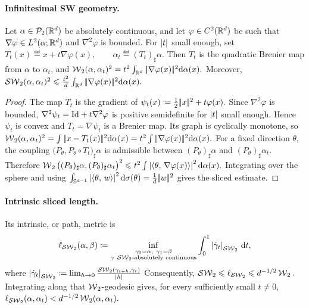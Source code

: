 \paragraph{Infinitesimal SW geometry.}
\begin{prop}\label{prop-sliced-first-order-tangent}
Let $\alpha\in\mathcal{P}_2(\mathbb{R}^d)$ be absolutely continuous, and let $\varphi\in C^2(\mathbb{R}^d)$ be such that $\nabla\varphi\in L^2(\alpha;\mathbb{R}^d)$ and $\nabla^2\varphi$ is bounded. For $\left\lvert t\right\rvert$ small enough, set
\(T_t(x)\eqdef x+t\nabla\varphi(x), \qquad \alpha_t\eqdef(T_t)_\sharp\alpha.\)
Then $T_t$ is the quadratic Brenier map from $\alpha$ to $\alpha_t$, and
\(\operatorname{\mathcal{W}}_2(\alpha,\alpha_t)^2 = t^2\int_{\mathbb{R}^d}|\!| \nabla\varphi(x) |\!|^2\mathrm{d}\alpha(x).\)
Moreover, \(\operatorname{\mathcal{SW}}_2(\alpha,\alpha_t)^2 \leqslant \frac{t^2}{d}\int_{\mathbb{R}^d}|\!| \nabla\varphi(x) |\!|^2\mathrm{d}\alpha(x).\)
\end{prop}
\begin{proof}
The map $T_t$ is the gradient of
\(\psi_t(x)\coloneqq \frac12|\!| x |\!|^2+t\varphi(x).\)
Since $\nabla^2\varphi$ is bounded, $\nabla^2\psi_t=\mathrm{Id}+t\nabla^2\varphi$ is positive semidefinite for $\left\lvert t\right\rvert$ small enough. Hence $\psi_t$ is convex and $T_t=\nabla\psi_t$ is a Brenier map. Its graph is cyclically monotone, so
\(\operatorname{\mathcal{W}}_2(\alpha,\alpha_t)^2 = \int|\!| x-T_t(x) |\!|^2\mathrm{d}\alpha(x) = t^2\int|\!| \nabla\varphi(x) |\!|^2\mathrm{d}\alpha(x).\)
For a fixed direction $\theta$, the coupling
\(\big(P_\theta,P_\theta\circ T_t\big)_\sharp\alpha\)
is admissible between $(P_\theta)_\sharp\alpha$ and $(P_\theta)_\sharp\alpha_t$. Therefore
\(\operatorname{\mathcal{W}}_2\big((P_\theta)_\sharp\alpha,(P_\theta)_\sharp\alpha_t\big)^2 \leqslant t^2\int\left\lvert\langle \theta,\,\nabla\varphi(x)\rangle\right\rvert^2\mathrm{d}\alpha(x).\)
Integrating over the sphere and using
\(\int_{\mathbb{S}^{d-1}}\left\lvert\langle \theta,\,w\rangle\right\rvert^2\mathrm{d}\sigma(\theta) = \frac1d|\!| w |\!|^2\)
gives the sliced estimate.
\end{proof}
\paragraph{Intrinsic sliced length.}\label{par-sliced-intrinsic-length}
Its intrinsic, or path, metric is
\begin{equation}\label{eq-intrinsic-sliced-length}
\ell_{\operatorname{\mathcal{SW}}_2}(\alpha,\beta)
\coloneqq
\inf_{\substack{\gamma_0=\alpha,\ \gamma_1=\beta\\
\gamma\ \text{$\operatorname{\mathcal{SW}}_2$-absolutely continuous}}}
\int_0^1 \left\lvert\dot\gamma_t\right\rvert_{\operatorname{\mathcal{SW}}_2}\,\mathrm{d} t,
\end{equation}
where \(\left\lvert\dot\gamma_t\right\rvert_{\operatorname{\mathcal{SW}}_2} \coloneqq \lim_{h\to0}\frac{\operatorname{\mathcal{SW}}_2(\gamma_{t+h},\gamma_t)}{\left\lvert h\right\rvert}\)
Consequently, \(\operatorname{\mathcal{SW}}_2\leqslant\ell_{\operatorname{\mathcal{SW}}_2}\leqslant d^{-1/2}\operatorname{\mathcal{W}}_2.\)
Integrating along that $\operatorname{\mathcal{W}}_2$-geodesic gives, for every sufficiently small $t\neq0$, \(\ell_{\operatorname{\mathcal{SW}}_2}(\alpha,\alpha_t) <d^{-1/2}\operatorname{\mathcal{W}}_2(\alpha,\alpha_t).\)
